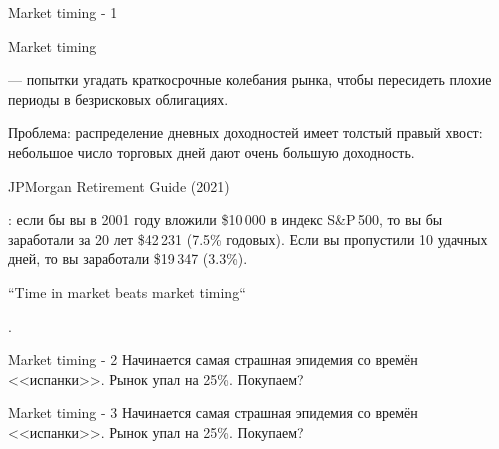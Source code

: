 \documentclass{beamer}
\newcommand{\en}[1]{\begin{otherlanguage}{english}#1\end{otherlanguage}}
\begin{document}
\begin{frame}{Market timing - 1}
\justify
\en{Market timing} --- попытки угадать краткосрочные колебания рынка, чтобы 
пересидеть плохие периоды в безрисковых облигациях.

\justify
Проблема: распределение дневных доходностей имеет толстый правый хвост: 
небольшое число торговых дней дают очень большую доходность.

\justify
\en{JPMorgan Retirement Guide (2021)}: если бы вы в 2001 году вложили \$10\,000 
в индекс S\&P\,500, то вы бы заработали за 20 лет \$42\,231 (7.5\% годовых). 
Если вы пропустили 10 удачных дней, то вы заработали \$19\,347 (3.3\%).

\justify
\en{``Time in market beats market timing``}.
\end{frame}



\begin{frame}{Market timing - 2}
\justify
Начинается самая страшная эпидемия со времён <<испанки>>. Рынок упал на 25\%. 
Покупаем?

\justify
\centering
{}
\end{frame}



\begin{frame}{Market timing - 3}
\justify
Начинается самая страшная эпидемия со времён <<испанки>>. Рынок упал на 25\%. 
Покупаем?

\justify
\centering
{}
\end{frame}
\end{document}
